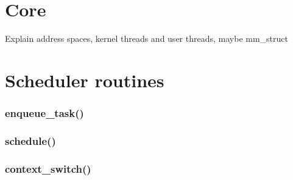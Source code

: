 \documentclass[10pt]{book}
\begin{document}
\section{Core} 
\label{sec:core}
Explain address spaces, kernel threads and user threads, maybe mm\_struct
\section{Scheduler routines} 
\subsubsection{enqueue\_task()}

\subsubsection{schedule()}

\subsubsection{context\_switch()}
\end{document}
